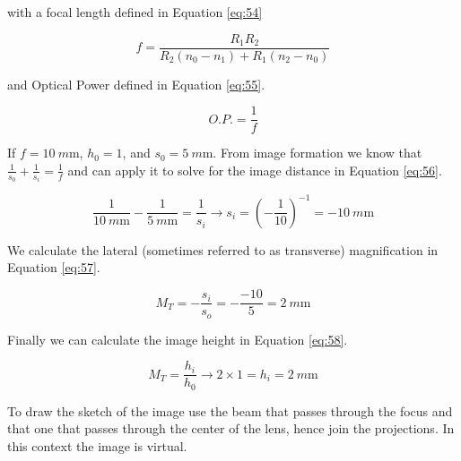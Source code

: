 \documentclass[main.tex]{subfiles}
\begin{document}
with a focal length defined in Equation \ref{eq:54}

\begin{equation}\label{eq:54}
f = \frac{R_1 R_2}{R_2(n_0 - n_1) + R_1(n_2 - n_0)}
\end{equation}

and Optical Power defined in Equation \ref{eq:55}.

\begin{equation}\label{eq:55}
O.P. = \frac{1}{f}
\end{equation}

If $f = \SI{10}{m\metre}$, $h_0 = 1$, and $s_0 = \SI{5}{m\metre}$. From image formation we know that $
\frac{1}{s_0} + \frac{1}{s_i} = \frac{1}{f}$ and can apply it to solve for the image distance in Equation \ref{eq:56}. 

\begin{equation}\label{eq:56}
\frac{1}{\SI{10}{m\meter}} - \frac{1}{\SI{5}{m\meter}} = \frac{1}{s_i} \rightarrow s_i = (-\frac{1}{10})^{-1} = \SI{-10}{m\metre}
\end{equation}

We calculate the lateral (sometimes referred to as transverse) magnification in Equation \ref{eq:57}. 

\begin{equation}\label{eq:57}
M_T = -\frac{s_i}{s_o} = -\frac{-10}{5} = \SI{2}{m\metre}
\end{equation}

Finally we can calculate the image height in Equation \ref{eq:58}.

\begin{equation}\label{eq:58}
M_T = \frac{h_i}{h_0} \rightarrow 2 \times 1 = h_i = \SI{2}{m\metre}
\end{equation}

To draw the sketch of the image use the beam that passes through the focus and that one that passes through the center of the lens, hence join the projections. In this context the image is virtual.
\end{document}

